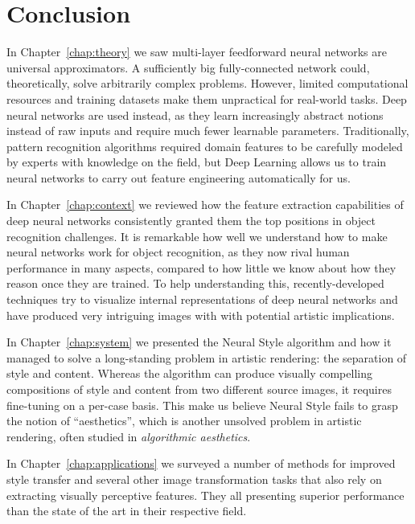 
\chapter{Conclusion}
\label{chap:conclusion}




In Chapter~\ref{chap:theory} we saw multi-layer feedforward neural networks are universal approximators.
A sufficiently big fully-connected network could, theoretically, solve arbitrarily complex problems.
However, limited computational resources and training datasets make them unpractical for real-world tasks.
Deep neural networks are used instead, as they learn increasingly abstract notions instead of raw inputs and require much fewer learnable parameters.
Traditionally, pattern recognition algorithms required domain features to be carefully modeled by experts with knowledge on the field, but Deep Learning allows us to train neural networks to carry out feature engineering automatically for us.

In Chapter~\ref{chap:context} we reviewed how the feature extraction capabilities of deep neural networks consistently granted them the top positions in object recognition challenges.
It is remarkable how well we understand how to make neural networks work for object recognition, as they now rival human performance in many aspects, compared to how little we know about how they reason once they are trained.
To help understanding this, recently-developed techniques try to visualize internal representations of deep neural networks and have produced very intriguing images with with potential artistic implications.

In Chapter~\ref{chap:system} we presented the Neural Style algorithm and how it managed to solve a long-standing problem in artistic rendering: the separation of style and content.
Whereas the algorithm can produce visually compelling compositions of style and content from two different source images, it requires fine-tuning on a per-case basis.
This make us believe Neural Style fails to grasp the notion of ``aesthetics'', which is another unsolved problem in artistic rendering, often studied in \emph{algorithmic aesthetics}.

In Chapter~\ref{chap:applications} we surveyed a number of methods for improved style transfer and several other image transformation tasks that also rely on extracting visually perceptive features.
They all presenting superior performance than the state of the art in their respective field.


